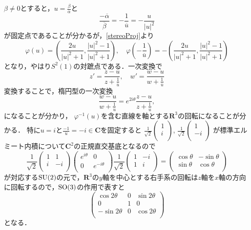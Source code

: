 $\beta\neq0$とすると，$u=\frac{\beta}{\alpha}$と
\[
   \frac{-\overline{\alpha}}{\overline{\beta}}=-\frac{1}{\overline{u}}=-\frac{u}{|u|^2}
\]
が固定点であることが分かるが，\eqref{stereoProj}より
\[
	\varphi(u)=(\frac{2u}{|u|^2+1}, \frac{|u|^2-1}{|u|^2+1}),\quad
	\varphi(-\frac{1}{\overline{u}})=-(\frac{2u}{|u|^2+1}, \frac{|u|^2-1}{|u|^2+1})
\]
となり，やはり$S^2(1)$の対蹠点である．一次変換で
\[
   z'=\frac{z-u}{z+\frac{1}{\overline{u}}},\quad
   w'=\frac{w-u}{w+\frac{1}{\overline{u}}}
\]
変換することで，楕円型の一次変換
\[
   \frac{w-u}{w+\frac{1}{\overline{u}}}
   = e^{2i\theta}\frac{z-u}{z+\frac{1}{\overline{u}}},
\]
になることが分かり，
$\varphi^{-1}(u)$を含む直線を軸とする$\mathbf R^3$の回転になることが分かる．
特に$u=i$と$\frac{-1}{\overline{u}}=-i\in \mathbf C$を固定すると
$
   \frac{1}{\sqrt2}
   \begin{pmatrix}
      1\\
      i\\
   \end{pmatrix}
$, 
$
   \frac{1}{\sqrt2}
   \begin{pmatrix}
      1\\
      -i\\
   \end{pmatrix}
$
が標準エルミート内積について$\mathbf C^2$の正規直交基底となるので
\[
   \frac{1}{\sqrt2}
   \begin{pmatrix}
      1&1\\
      i&-i\\
   \end{pmatrix}
   \begin{pmatrix}
      e^{i\theta} &0\\
     0& e^{-i\theta}\\
   \end{pmatrix}
   \frac{1}{\sqrt2}
   \begin{pmatrix}
      1&-i\\
      1&i\\
   \end{pmatrix}
   =
   \begin{pmatrix}
      \cos{\theta} &-\sin \theta\\
     \sin \theta& \cos{\theta}\\
   \end{pmatrix}
\]
が対応する$\operatorname{SU}(2)$の元で，$\mathbf R^3$の$y$軸を中心とする右手系の回転は$z$軸を$x$軸の方向に回転するので，$\operatorname{SO}(3)$の作用で表すと
\[
   \begin{pmatrix}
      \cos 2\theta& 0&\sin 2\theta\\
      0&1&0\\
      -\sin 2\theta&0& \cos 2\theta\\
   \end{pmatrix}
\]
となる．


